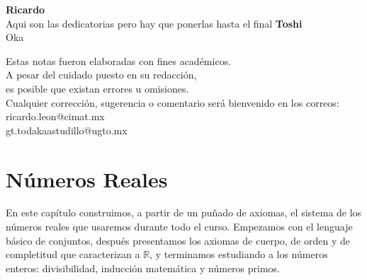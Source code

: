 \documentclass[12pt,a4paper]{book}
\begin{document}
        
    
  \thispagestyle{empty}
  

  \begin{flushright}
    \thispagestyle{empty}

    \textbf{Ricardo}\\[0.3cm]  
      Aqui son las dedicatorias pero hay que ponerlas hasta el final
      \textbf{Toshi}\\[0.3cm]
      Oka
  \end{flushright}


  \cleardoublepage
  \thispagestyle{empty}

  \begin{mdframed}[style=mdgreenbox]
    \begin{center}
    \small
    Estas notas fueron elaboradas con fines académicos.\\
    A pesar del cuidado puesto en su redacción,\\
    es posible que existan errores u omisiones.\\[0.3cm]

    Cualquier corrección, sugerencia o comentario será bienvenido
    en los correos: \\[0.3cm]

    ricardo.leon@cimat.mx\\
    gt.todakaastudillo@ugto.mx
    \end{center}
  \end{mdframed}

    
  \setcounter{page}{1}
  \tableofcontents

  \chapter{Números Reales}
 
  En este capítulo construimos, a partir de un puñado de axiomas, el sistema de los números reales que usaremos durante todo el curso. Empezamos con el lenguaje básico de conjuntos, después presentamos los axiomas de cuerpo, de orden y de completitud que caracterizan a $\mathbb{R}$, y terminamos estudiando a los números enteros: divisibilidad, inducción matemática y números primos.
  
\end{document}
